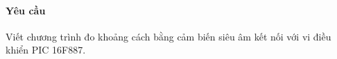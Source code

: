 \paragraph{Yêu cầu}Viết chương trình đo khoảng cách bằng cảm biến siêu âm kết nối với vi điều khiển PIC 16F887.
\begin{comment}
\paragraph{Hướng giải quyết}
\begin{itemize}
\item[$\ast$] Viết chương trình theo mode 1: chân Echo và chân Trigger dùng riêng.
\item[$\ast$] Sử dụng Timer 1 kết hợp với ngắt để đếm thời gian chân Echo ở mức cao.
\item Khai báo chân chân Trigger là chân OUTPUT, chân Echo là chân INPUT nối với ngắt ngoài của vi điều khiển (chân B0).
\item Xuất mức 1 ra chân Trigger và giữ trạng thái $10\mu s$ rồi kéo chân Trigger xuống mức 0.
\item Dùng câu lệnh sau để đợi chân Echo lên mức cao: \verb|while (input(echo == 0));| không làm gì cả. Khi chân Echo lên mức cao, sẽ tự thoát khỏi vòng lặp \verb|while|.
\item Kích hoạt Timer 1 để đếm thời gian: \verb|SET_TIMER1(0);| bắt đầu đếm từ 0.
\item Đợi chân Echo xuống mức thấp: sử dụng ngắt ngoài để phát hiện xung cạnh xuống: \verb|EXT_INT_EDGE(H_TO_L);|
\item Khi phát hiện có ngắt:
\begin{itemize}
\item Kiểm tra có phải ngắt do nhiễu hay ngắt đúng mong muốn: sử dụng lại phương pháp trong \textit{bài tập \ref{Ex:3-4} trang \pageref{Ex:3-4}}.
\item Nếu không phải ngắt do nhiễu thì ta xử lý:
\begin{list}{+}{}
\item Tần số thạch anh là: $f = 20MHz$, tần số xung nội: $$ F^\prime = \frac{F}{4} = \frac{20MHz}{4} = 5MHz$$.
\item Nên sẽ thực hiện $5000$ xung trong $1ms$.
\item Giá trị tối đa của Timer 1 là $65535$, suy ra: Timer 1 đếm được tối đa là $\displaystyle \frac{65535}{5000} = 13.107ms < 30ms$, nên ta sử dụng bộ chia 4.
\item Với bộ chia 4 thì Timer 1 đếm được tối đa $4 \times 13.107 = 52.428ms > 30ms$, thỏa điều kiện.
\item[$\ast$] \textit{Kết luận}: Với bộ chia 4 -- $1ms$ thực hiện $1250$ xung, suy ra: $1\mu s$ thực hiện $1.25$ xung. Suy ra: thời gian đếm được: $$t = 1.25 \times GET\_TIMER1()$$
\item Tính ra khoảng cách: $\displaystyle d = \frac{t}{58.14} ~cm$
\item Reset lại Timer1: \verb|SET_TIMER1(0);|
\end{list}
\end{itemize}
\end{itemize}
\end{comment}
